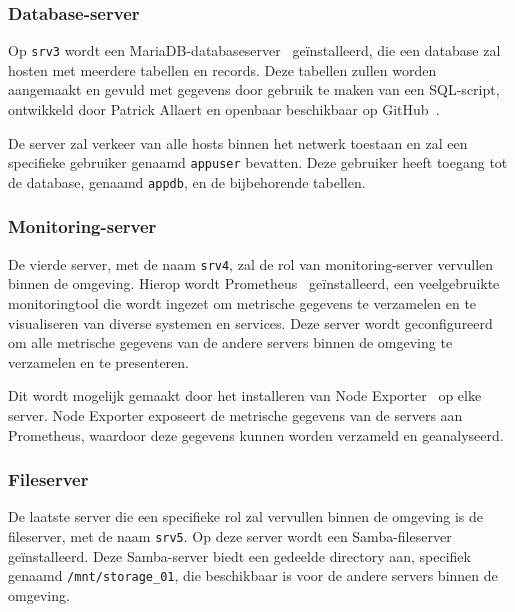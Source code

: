 \subsubsection{Database-server}
\label{poc_database_server}

Op \texttt{srv3} wordt een MariaDB-databaseserver~\autocite{maria-home} ge\"installeerd, die een database zal hosten met meerdere tabellen en records.
Deze tabellen zullen worden aangemaakt en gevuld met gegevens door gebruik te maken van een SQL-script, ontwikkeld door Patrick Allaert en openbaar beschikbaar op GitHub~\autocite{github-sql-script}.

De server zal verkeer van alle hosts binnen het netwerk toestaan en zal een specifieke gebruiker genaamd \texttt{appuser} bevatten.
Deze gebruiker heeft toegang tot de database, genaamd \texttt{appdb}, en de bijbehorende tabellen.

\subsubsection{Monitoring-server}
\label{poc_monitoring_server}

De vierde server, met de naam \texttt{srv4}, zal de rol van monitoring-server vervullen binnen de omgeving.
Hierop wordt Prometheus~\autocite{prometheus-home} ge\"installeerd, een veelgebruikte monitoringtool die wordt ingezet om metrische gegevens te verzamelen en te visualiseren van diverse systemen en services.
Deze server wordt geconfigureerd om alle metrische gegevens van de andere servers binnen de omgeving te verzamelen en te presenteren.

Dit wordt mogelijk gemaakt door het installeren van Node Exporter~\autocite{node-exporter-home} op elke server.
Node Exporter exposeert de metrische gegevens van de servers aan Prometheus, waardoor deze gegevens kunnen worden verzameld en geanalyseerd.

\subsubsection{Fileserver}
\label{poc_fileserver}

De laatste server die een specifieke rol zal vervullen binnen de omgeving is de fileserver, met de naam \texttt{srv5}.
Op deze server wordt een Samba-fileserver~\autocite{samba-home} ge\"installeerd.
Deze Samba-server biedt een gedeelde directory aan, specifiek genaamd \texttt{/mnt/storage\_01}, die beschikbaar is voor de andere servers binnen de omgeving.

